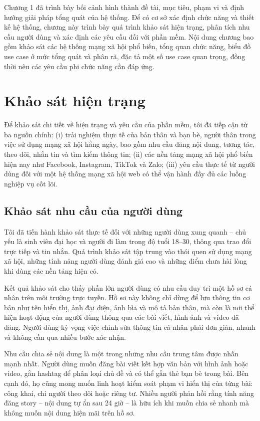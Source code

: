 \documentclass[../DoAn.tex]{subfiles}
\begin{document}
Chương 1 đã trình bày bối cảnh hình thành đề tài, mục tiêu, phạm vi và định hướng giải pháp tổng quát của hệ thống. Để có cơ sở xác định chức năng và thiết kế hệ thống, chương này trình bày quá trình khảo sát hiện trạng, phân tích nhu cầu người dùng và xác định các yêu cầu đối với phần mềm. Nội dung chương bao gồm khảo sát các hệ thống mạng xã hội phổ biến, tổng quan chức năng, biểu đồ use case ở mức tổng quát và phân rã, đặc tả một số use case quan trọng, đồng thời nêu các yêu cầu phi chức năng cần đáp ứng.

\section{Khảo sát hiện trạng}
\label{section:2.1}
Để khảo sát chi tiết về hiện trạng và yêu cầu của phần mềm, tôi đã tiếp cận từ ba nguồn chính: (i) trải nghiệm thực tế của bản thân và bạn bè, người thân trong việc sử dụng mạng xã hội hằng ngày, bao gồm nhu cầu đăng nội dung, tương tác, theo dõi, nhắn tin và tìm kiếm thông tin; (ii) các nền tảng mạng xã hội phổ biến hiện nay như Facebook, Instagram, TikTok và Zalo; (iii) yêu cầu thực tế từ người dùng đối với một hệ thống mạng xã hội web có thể vận hành đầy đủ các luồng nghiệp vụ cốt lõi.

\subsection{Khảo sát nhu cầu của người dùng}
\label{subsection:2.1.1}
Tôi đã tiến hành khảo sát thực tế đối với những người dùng xung quanh -- chủ yếu là sinh viên đại học và người đi làm trong độ tuổi 18--30, thông qua trao đổi trực tiếp và tin nhắn. Quá trình khảo sát tập trung vào thói quen sử dụng mạng xã hội, những tính năng người dùng đánh giá cao và những điểm chưa hài lòng khi dùng các nền tảng hiện có.

Kết quả khảo sát cho thấy phần lớn người dùng có nhu cầu duy trì một hồ sơ cá nhân trên môi trường trực tuyến. Hồ sơ này không chỉ dùng để lưu thông tin cơ bản như tên hiển thị, ảnh đại diện, ảnh bìa và mô tả bản thân, mà còn là nơi thể hiện hoạt động của người dùng thông qua các bài viết, hình ảnh và video đã đăng. Người dùng kỳ vọng việc chỉnh sửa thông tin cá nhân phải đơn giản, nhanh và không cần qua nhiều bước xác nhận.

Nhu cầu chia sẻ nội dung là một trong những nhu cầu trung tâm được nhấn mạnh nhất. Người dùng muốn đăng bài viết kết hợp văn bản với hình ảnh hoặc video, gắn hashtag để phân loại chủ đề và có thể gắn thẻ bạn bè trong bài. Bên cạnh đó, họ cũng mong muốn linh hoạt kiểm soát phạm vi hiển thị của từng bài: công khai, chỉ người theo dõi hoặc riêng tư. Nhiều người phản hồi rằng tính năng đăng story -- nội dung tự ẩn sau 24 giờ -- là hữu ích khi muốn chia sẻ nhanh mà không muốn nội dung hiện mãi trên hồ sơ.
\end{document}
